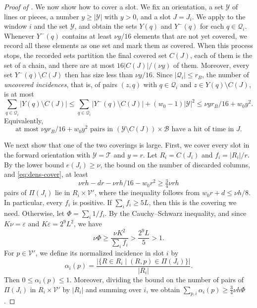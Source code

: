 \documentclass[fontsize=12pt,leading=14pt]{fullpaper}
\newcommand{\Bcal}{\mathcal{B}}
\newcommand{\Qcal}{\mathcal{Q}}
\newcommand{\Tcal}{\mathcal{T}}
\newcommand{\Vcal}{\mathcal{V}}
\newcommand{\Ycal}{\mathcal{Y}}
\newcommand{\eps}{\varepsilon}
\begin{document}
\begin{proof}[Proof of ]
  We now show how to cover a slot.
  We fix an orientation, a set $\Ycal$ of lines or pieces, a number $y\ge|\Ycal|$ with $y>0$, and a slot $J=J_i$.
  We apply  to the window $i$ and the set $\Ycal$, and obtain the sets $Y(q)$ and $Y^-(q)$ for each $q\in\Qcal_i$.
  Whenever $Y^-(q)$ contains at least $\nu y/16$ elements that are not yet covered, we record all these elements as one set and mark them as covered.
  When this process stops, the recorded sets partition the final covered set $C(J)$, each of them is the set of a chain, and there are at most $16|C(J)|/(\nu y)$ of them.
  Moreover, every set $Y^-(q)\setminus C(J)$ then has size less than $\nu y/16$.
  Since $|\Qcal_i|\le r_B$, the number of \emph{uncovered incidences}, that is, of pairs $(z,q)$ with $q\in\Qcal_i$ and $z\in Y(q)\setminus C(J)$, is at most
  \[
    \sum_{q\in\Qcal_i}|Y(q)\setminus C(J)|
    \le\sum_{q\in\Qcal_i}|Y^-(q)\setminus C(J)|+(w_0-1)|\Ycal|^2
    \le\nu yr_B/16+w_0y^2.
  \]
  Equivalently,
  \begin{equation}\label{eq:dens-cover}
    \text{at most }\nu yr_B/16+w_0y^2\text{ pairs in }(\Ycal\setminus C(J))\times\Bcal\text{ have a hit of time in }J.
  \end{equation}

  We next show that one of the two coverings is large.
  First, we cover every slot in the forward orientation with $\Ycal=\Tcal$ and $y=r$.
  Let $R_i=C(J_i)$ and $f_i=|R_i|/r$.
  By the lower bound $e(J_i)\ge\nu$, the bound on the number of discarded columns, and \eqref{eq:dens-cover}, at least
  \[
    \nu rh-dr-\nu rh/16-w_0r^2\ge\tfrac34\nu rh
  \]
  pairs of $\Pi(J_i)$ lie in $R_i\times\Vcal'$, where the inequality follows from $w_0r+d\le\nu h/8$.
  In particular, every $f_i$ is positive.
  If $\sum_i f_i\ge5L$, then this is the covering we need.
  Otherwise, let $\Phi=\sum_i1/f_i$.
  By the Cauchy--Schwarz inequality, and since $K\nu=\eps$ and $K\eps=2^9L^2$, we have
  \[
    \nu\Phi\ge\frac{\nu K^2}{\sum_i f_i}>\frac{2^9L}{5}>1.
  \]
  For $p\in\Vcal'$, we define its normalized incidence in slot $i$ by
  \[
    \alpha_i(p)=\frac{|\{R\in R_i\mid(R,p)\in\Pi(J_i)\}|}{|R_i|}.
  \]
  Then $0\le\alpha_i(p)\le1$.
  Moreover, dividing the bound on the number of pairs of $\Pi(J_i)$ in $R_i\times\Vcal'$ by $|R_i|$ and summing over $i$, we obtain $\sum_{p,i}\alpha_i(p)\ge\tfrac34\nu h\Phi$.


\end{proof}
\end{document}
